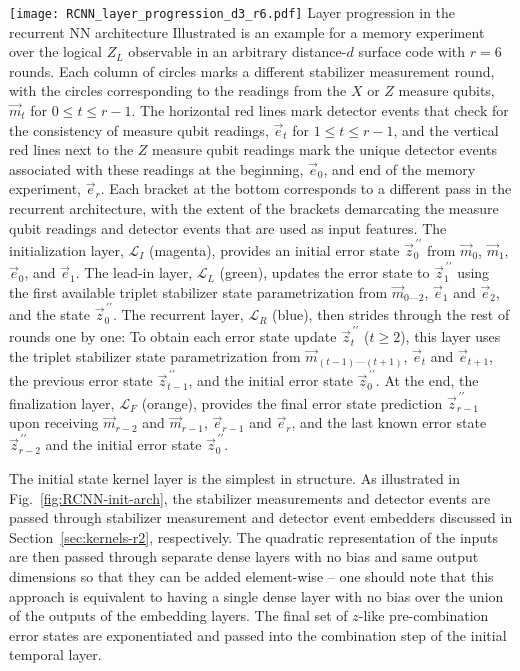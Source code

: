 \begin{figure*}[htb]
\centering
\texttt{[image: RCNN\_layer\_progression\_d3\_r6.pdf]}
\ccaption
{Layer progression in the recurrent NN architecture}
{
Illustrated is an example for a memory experiment over the logical $Z_L$ observable in an arbitrary distance-$d$ surface code with $r=6$ rounds. Each column of circles marks a different stabilizer measurement round, with the circles corresponding to the readings from the $X$ or $Z$ measure qubits, $\vec{m}_t$ for $0\leq t \leq r-1$. The horizontal red lines mark detector events that check for the consistency of measure qubit readings, $\vec{e}_t$ for $1 \leq t \leq r-1$, and the vertical red lines next to the $Z$ measure qubit readings mark the unique detector events associated with these readings at the beginning, $\vec{e}_0$, and end of the memory experiment, $\vec{e}_{r}$.
Each bracket at the bottom corresponds to a different pass in the recurrent architecture, with the extent of the brackets demarcating the measure qubit readings and detector events that are used as input features.
The initialization layer, $\mathcal{L}_I$ (magenta), provides an initial error state $\vec{z}^{\,\prime\prime}_0$ from $\vec{m}_0$, $\vec{m}_1$, $\vec{e}_0$, and $\vec{e}_1$.
The lead-in layer, $\mathcal{L}_L$ (green), updates the error state to $\vec{z}^{\,\prime\prime}_1$ using the first available triplet stabilizer state parametrization from $\vec{m}_{0 \text{---} 2}$, $\vec{e}_1$ and $\vec{e}_2$, and the state $\vec{z}^{\,\prime\prime}_0$.
The recurrent layer, $\mathcal{L}_R$ (blue), then strides through the rest of rounds one by one: To obtain each error state update $\vec{z}^{\,\prime\prime}_{t}$ ($t\geq2$), this layer uses the triplet stabilizer state parametrization from $\vec{m}_{(t-1) \text{---} (t+1)}$, $\vec{e}_{t}$ and $\vec{e}_{t+1}$, the previous error state $\vec{z}^{\,\prime\prime}_{t-1}$, and the initial error state $\vec{z}^{\,\prime\prime}_{0}$.
At the end, the finalization layer, $\mathcal{L}_F$ (orange), provides the final error state prediction $\vec{z}^{\,\prime\prime}_{r-1}$ upon receiving $\vec{m}_{r-2}$ and $\vec{m}_{r-1}$, $\vec{e}_{r-1}$ and $\vec{e}_r$, and the last known error state $\vec{z}^{\,\prime\prime}_{r-2}$ and the initial error state $\vec{z}^{\,\prime\prime}_{0}$.
}
\label{fig:RCNN-layer-prog}
\end{figure*}


The initial state kernel layer is the simplest in structure. As illustrated in Fig.~\ref{fig:RCNN-init-arch}, the stabilizer measurements and detector events are passed through stabilizer measurement and detector event embedders discussed in Section~\ref{sec:kernels-r2}, respectively. 
The quadratic representation of the inputs are then passed through separate dense layers with no bias and same output dimensions so that they can be added element-wise -- one should note that this approach is equivalent to having a single dense layer with no bias over the union of the outputs of the embedding layers. 
The final set of $z$-like pre-combination error states are exponentiated and passed into the combination step of the initial temporal layer.


